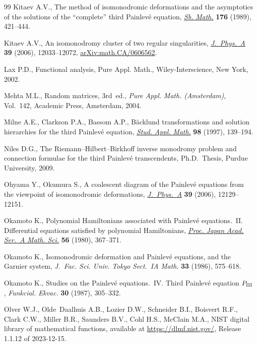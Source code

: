 \documentclass[pdftex]{sigma}
\numberwithin{equation}{section}
\begin{document}
\begin{thebibliography}{99}
Kitaev A.V., The method of isomonodromic deformations and the asymptotics of
 the solutions of the ``complete'' third {P}ainlev\'e equation, \href{https://doi.org/10.1070/SM1989v062n02ABEH003247}{\textit{Sb.
 Math.}} \textbf{176} (1989), 421--444.

Kitaev A.V., An isomonodromy cluster of two regular singularities,
 \href{https://doi.org/10.1088/0305-4470/39/39/S03}{\textit{J.~Phys.~A}} \textbf{39} (2006), 12033--12072,
 \href{https://arxiv.org/abs/math.CA/0606562}{arXiv:math.CA/0606562}.

Lax P.D., Functional analysis, Pure Appl. Math., Wiley-Interscience, New York,
 2002.

Mehta M.L., Random matrices, 3rd~ed., \textit{Pure Appl. Math. (Amsterdam)}, Vol.~142,
 Academic Press, Amsterdam, 2004.

Milne A.E., Clarkson P.A., Bassom A.P., B\"acklund transformations and solution
 hierarchies for the third {P}ainlev\'e equation, \href{https://doi.org/10.1111/1467-9590.00044}{\textit{Stud. Appl. Math.}}
 \textbf{98} (1997), 139--194.

Niles D.G., The {R}iemann--{H}ilbert--{B}irkhoff inverse monodromy problem and
 connection formulae for the third {P}ainlev\'e transcendents, Ph.D.~Thesis,
 {P}urdue {U}niversity, 2009.

Ohyama Y., Okumura S., A coalescent diagram of the {P}ainlev\'e equations from
 the viewpoint of isomonodromic deformations, \href{https://doi.org/10.1088/0305-4470/39/39/S08}{\textit{J.~Phys.~A}} \textbf{39}
 (2006), 12129--12151.

Okamoto K., Polynomial {H}amiltonians associated with {P}ainlev\'e
 equations.~{II}. {D}ifferential equations satisfied by polynomial
 {H}amiltonians, \href{https://doi.org/10.3792/pjaa.56.367}{\textit{Proc. Japan Acad. Ser.~A Math. Sci.}} \textbf{56}
 (1980), 367--371.

Okamoto K., Isomonodromic deformation and {P}ainlev\'e equations, and the
 {G}arnier system, \textit{J.~Fac. Sci. Univ. Tokyo Sect.~IA Math.}
 \textbf{33} (1986), 575--618.

Okamoto K., Studies on the {P}ainlev\'e equations.~{IV}. {T}hird {P}ainlev\'e
 equation {$P_{{\rm III}}$}, \textit{Funkcial. Ekvac.} \textbf{30} (1987),
 305--332.

Olver W.J., Olde~Daalhuis A.B., Lozier D.W., Schneider B.I., Boisvert R.F.,
 Clark C.W., Miller B.R., Saunders B.V., Cohl H.S., McClain M.A., NIST digital
 library of mathematical functions, available at \url{https://dlmf.nist.gov/},
 Release 1.1.12 of 2023-12-15.


\end{thebibliography}
\end{document}
